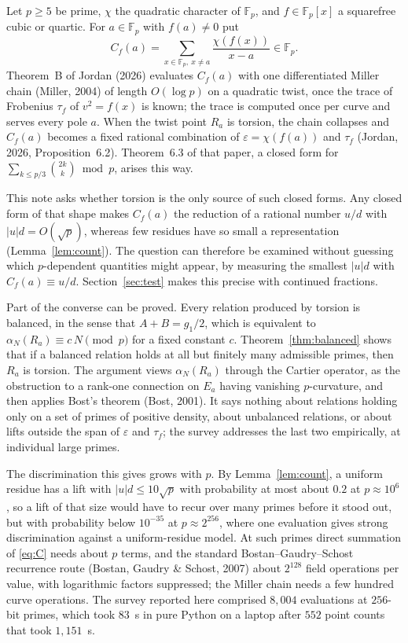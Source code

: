 \documentclass[11pt,a4paper]{article}
\numberwithin{equation}{section}
\theoremstyle{plain}
\theoremstyle{definition}
\newcommand{\F}{\mathbb{F}}
\newcommand{\eps}{\varepsilon}
\begin{document}
Let $p\ge5$ be prime, $\chi$ the quadratic character of $\F_p$, and $f\in\F_p[x]$ a squarefree cubic or quartic. For $a\in\F_p$ with $f(a)\neq0$ put
\begin{equation}\label{eq:C}
C_f(a)=\sum_{x\in\F_p,\ x\neq a}\frac{\chi(f(x))}{x-a}\in\F_p .
\end{equation}
Theorem~B of Jordan (2026) evaluates $C_f(a)$ with one differentiated Miller chain (Miller, 2004) of length $O(\log p)$ on a quadratic twist, once the trace of Frobenius $\tau_f$ of $v^2=f(x)$ is known; the trace is computed once per curve and serves every pole $a$. When the twist point $R_a$ is torsion, the chain collapses and $C_f(a)$ becomes a fixed rational combination of $\eps=\chi(f(a))$ and $\tau_f$ (Jordan, 2026, Proposition~6.2). Theorem~6.3 of that paper, a closed form for $\sum_{k\le p/3}\binom{2k}{k}\bmod p$, arises this way.

This note asks whether torsion is the only source of such closed forms. Any closed form of that shape makes $C_f(a)$ the reduction of a rational number $u/d$ with $|u|d=O(\sqrt p)$, whereas few residues have so small a representation (Lemma~\ref{lem:count}). The question can therefore be examined without guessing which $p$-dependent quantities might appear, by measuring the smallest $|u|d$ with $C_f(a)\equiv u/d$. Section~\ref{sec:test} makes this precise with continued fractions.

Part of the converse can be proved. Every relation produced by torsion is balanced, in the sense that $A+B=g_1/2$, which is equivalent to $\alpha_N(R_a)\equiv c\,N\pmod p$ for a fixed constant $c$. Theorem~\ref{thm:balanced} shows that if a balanced relation holds at all but finitely many admissible primes, then $R_a$ is torsion. The argument views $\alpha_N(R_a)$ through the Cartier operator, as the obstruction to a rank-one connection on $E_a$ having vanishing $p$-curvature, and then applies Bost's theorem (Bost, 2001). It says nothing about relations holding only on a set of primes of positive density, about unbalanced relations, or about lifts outside the span of $\eps$ and $\tau_f$; the survey addresses the last two empirically, at individual large primes.

The discrimination this gives grows with $p$. By Lemma~\ref{lem:count}, a uniform residue has a lift with $|u|d\le10\sqrt p$ with probability at most about $0.2$ at $p\approx10^6$, so a lift of that size would have to recur over many primes before it stood out, but with probability below $10^{-35}$ at $p\approx2^{256}$, where one evaluation gives strong discrimination against a uniform-residue model. At such primes direct summation of \eqref{eq:C} needs about $p$ terms, and the standard Bostan--Gaudry--Schost recurrence route (Bostan, Gaudry \& Schost, 2007) about $2^{128}$ field operations per value, with logarithmic factors suppressed; the Miller chain needs a few hundred curve operations. The survey reported here comprised $8{,}004$ evaluations at $256$-bit primes, which took $83$~s in pure Python on a laptop after $552$ point counts that took $1{,}151$~s.
\end{document}

